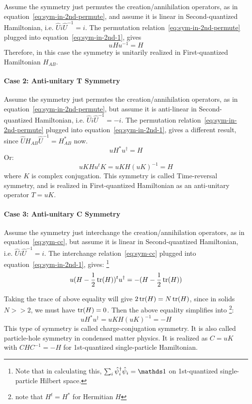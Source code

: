 \documentclass{article}
\begin{document}
Assume the symmetry just permutes the creation/annihilation operators, as in
equation~\ref{eq:sym-in-2nd-permute}, and assume it is linear in
Second-quantized Hamiltonian, i.e. $\hat{U}i\hat{U}^{-1}=i$. The permutation
relation~\ref{eq:sym-in-2nd-permute} plugged into
equation~\ref{eq:sym-in-2nd-1}, gives
\begin{equation}
    u H u^{-1} = H
\end{equation}
Therefore, in this case the symmetry is unitarily realized in First-quantized
Hamiltonian $H_{AB}$.

\paragraph{Case 2: Anti-unitary T Symmetry}
Assume the symmetry just permutes the creation/annihilation operators, as in
equation~\ref{eq:sym-in-2nd-permute}, but assume it is anti-linear in
Second-quantized Hamiltonian, i.e. $\hat{U}i\hat{U}^{-1}=-i$. The permutation
relation~\ref{eq:sym-in-2nd-permute} plugged into
equation~\ref{eq:sym-in-2nd-1}, gives a different result, since
$\hat{U}H_{AB}\hat{U}^{-1} = H_{AB}^*$ now.
\begin{equation}
    u H^* u^\dagger = H
\end{equation}
Or:
\begin{equation}
    uK H u^t K = uK H (uK)^{-1} = H
\end{equation}
where $K$ is complex conjugation. This symmetry is called Time-reversal
symmetry, and is realized in First-quantized Hamiltonian as an anti-unitary
operator $T= uK$.

\paragraph{Case 3: Anti-unitary C Symmetry}
Assume the symmetry just interchange the creation/annihilation operators, as in
equation~\ref{eq:sym-cc}, but assume it is linear in Second-quantized
Hamiltonian, i.e. $\hat{U}i\hat{U}^{-1}=i$. The interchange
relation~\ref{eq:sym-cc} plugged into equation~\ref{eq:sym-in-2nd-1}, gives:
\footnote{
Note that in calculating this, $\sum_i\hat\psi^\dagger_i \hat\psi_i =
\id$ on 1st-quantized single-particle Hilbert space.
}
\begin{equation}
    \label{eq:sym-C-cond}
    u (H-\frac{1}{2}\tr(H))^t u^\dagger = - (H-\frac{1}{2}\tr(H))
\end{equation}

Taking the trace of above equality will give $2\tr(H)=N\tr(H)$, since
in solids $N>>2$, we must have $\tr(H)=0$. Then the above equality
simplifies into \footnote{note that $H^t = H^*$ for Hermitian $H$}:
\begin{equation}
    u H^* u^\dagger = uK H (uK)^{-1} = -H
\end{equation}
This type of symmetry is called charge-conjugation symmetry. It is
also called particle-hole symmetry in condensed matter physics. It is realized
as $C=uK$ with $C H C^{-1} = -H$ for 1st-quantized single-particle Hamiltonian.
\end{document}
